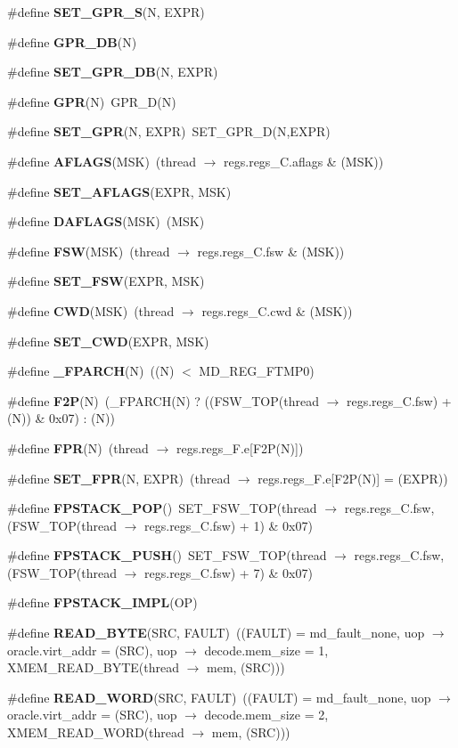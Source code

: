 \begin{CompactItemize}
\#define {\bf SET\_\-GPR\_\-S}(N, EXPR)
\item 
\#define {\bf GPR\_\-DB}(N)
\item 
\#define {\bf SET\_\-GPR\_\-DB}(N, EXPR)
\item 
\#define {\bf GPR}(N)~GPR\_\-D(N)
\item 
\#define {\bf SET\_\-GPR}(N, EXPR)~SET\_\-GPR\_\-D(N,EXPR)
\item 
\#define {\bf AFLAGS}(MSK)~(thread $\rightarrow$ regs.regs\_\-C.aflags \& (MSK))
\item 
\#define {\bf SET\_\-AFLAGS}(EXPR, MSK)
\item 
\#define {\bf DAFLAGS}(MSK)~(MSK)
\item 
\#define {\bf FSW}(MSK)~(thread $\rightarrow$ regs.regs\_\-C.fsw \& (MSK))
\item 
\#define {\bf SET\_\-FSW}(EXPR, MSK)
\item 
\#define {\bf CWD}(MSK)~(thread $\rightarrow$ regs.regs\_\-C.cwd \& (MSK))
\item 
\#define {\bf SET\_\-CWD}(EXPR, MSK)
\item 
\#define {\bf \_\-FPARCH}(N)~((N) $<$ MD\_\-REG\_\-FTMP0)
\item 
\#define {\bf F2P}(N)~(\_\-FPARCH(N) ? ((FSW\_\-TOP(thread $\rightarrow$ regs.regs\_\-C.fsw) + (N)) \& 0x07) : (N))
\item 
\#define {\bf FPR}(N)~(thread $\rightarrow$ regs.regs\_\-F.e[F2P(N)])
\item 
\#define {\bf SET\_\-FPR}(N, EXPR)~(thread $\rightarrow$ regs.regs\_\-F.e[F2P(N)] = (EXPR))
\item 
\#define {\bf FPSTACK\_\-POP}()~SET\_\-FSW\_\-TOP(thread $\rightarrow$ regs.regs\_\-C.fsw, (FSW\_\-TOP(thread $\rightarrow$ regs.regs\_\-C.fsw) + 1) \& 0x07)
\item 
\#define {\bf FPSTACK\_\-PUSH}()~SET\_\-FSW\_\-TOP(thread $\rightarrow$ regs.regs\_\-C.fsw, (FSW\_\-TOP(thread $\rightarrow$ regs.regs\_\-C.fsw) + 7) \& 0x07)
\item 
\#define {\bf FPSTACK\_\-IMPL}(OP)
\item 
\#define {\bf READ\_\-BYTE}(SRC, FAULT)~((FAULT) = md\_\-fault\_\-none, uop $\rightarrow$ oracle.virt\_\-addr = (SRC), uop $\rightarrow$ decode.mem\_\-size = 1, XMEM\_\-READ\_\-BYTE(thread $\rightarrow$ mem, (SRC)))
\item 
\#define {\bf READ\_\-WORD}(SRC, FAULT)~((FAULT) = md\_\-fault\_\-none, uop $\rightarrow$ oracle.virt\_\-addr = (SRC), uop $\rightarrow$ decode.mem\_\-size = 2, XMEM\_\-READ\_\-WORD(thread $\rightarrow$ mem, (SRC)))

\end{CompactItemize}
